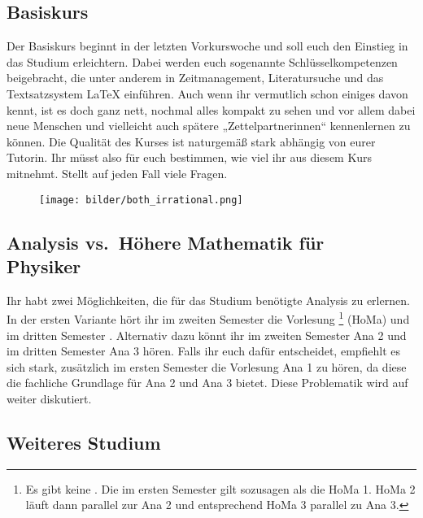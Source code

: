 \subsection{Basiskurs}
Der Basiskurs beginnt in der letzten Vorkurswoche und soll euch den Einstieg in das Studium erleichtern. Dabei werden euch sogenannte Schlüsselkompetenzen beigebracht, die unter anderem in Zeitmanagement, Literatursuche und das Textsatzsystem \LaTeX{} einführen. Auch wenn ihr vermutlich schon einiges davon kennt, ist es doch ganz nett, nochmal alles kompakt zu sehen und vor allem dabei neue Menschen und vielleicht auch spätere „Zettelpartnerinnen“ kennenlernen zu können. Die Qualität des Kurses ist naturgemäß stark abhängig von eurer Tutorin. Ihr müsst also für euch bestimmen, wie viel ihr aus diesem Kurs mitnehmt. Stellt auf jeden Fall viele Fragen.

\begin{figure}[b]
	\centering
	\texttt{[image: bilder/both\_irrational.png]}
\end{figure}


\subsection{Analysis vs.~Höhere Mathematik für \\Physiker}
Ihr habt zwei Möglichkeiten, die für das Studium benötigte Analysis zu erlernen.
In der ersten Variante hört ihr im zweiten Semester die Vorlesung \footnote{Es gibt keine . Die  im ersten Semester gilt sozusagen als die \gls{HoMa} 1. \gls{HoMa} 2 läuft dann parallel zur \gls{Ana} 2 und entsprechend \gls{HoMa} 3 parallel zu \gls{Ana} 3.} (\gls{HoMa}) und im dritten Semester . Alternativ dazu könnt ihr im zweiten Semester \gls{Ana} 2 und im dritten Semester \gls{Ana} 3 hören. Falls ihr euch dafür entscheidet, empfiehlt es sich stark, zusätzlich im ersten Semester die Vorlesung \gls{Ana} 1 zu hören, da diese die fachliche Grundlage für \gls{Ana} 2 und \gls{Ana} 3 bietet. Diese Problematik wird auf  weiter diskutiert.

\subsection{Weiteres Studium}

